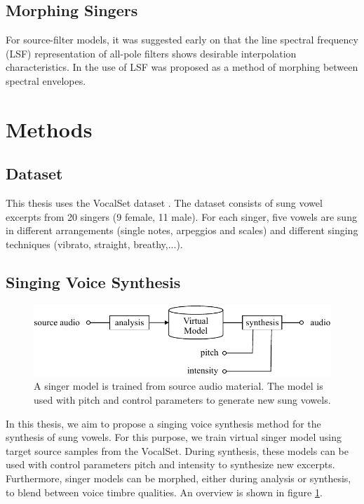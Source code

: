 \documentclass{article}
\begin{document}
\subsection{Morphing Singers}

For source-filter models, it was suggested early on that the line spectral frequency (LSF)\cite{itakura_line_1975} representation of all-pole filters shows desirable interpolation characteristics. In \cite{roddy_method_2014} the use of LSF was proposed as a method of morphing between spectral envelopes. 


\section{Methods}

\subsection{Dataset}

This thesis uses the VocalSet dataset \cite{wilkins_vocalset:_2018}. The dataset consists of sung vowel excerpts from 20 singers (9 female, 11 male). For each singer, five vowels are sung in different arrangements (single notes, arpeggios and scales) and different singing techniques (vibrato, straight, breathy,...). 

\subsection{Singing Voice Synthesis}

\begin{figure}[H]
    \centering
    \includegraphics{Graphics/005_method_singer_model.pdf}
    \caption{A singer model is trained from source audio material. The model is used with pitch and control parameters to generate new sung vowels.}
    \label{fig:singer_model}
\end{figure}

In this thesis, we aim to propose a singing voice synthesis method for the synthesis of sung vowels. For this purpose, we train virtual singer model using target source samples from the VocalSet. During synthesis, these models can be used with control parameters pitch and intensity to synthesize new excerpts. Furthermore, singer models can be morphed, either during analysis or synthesis, to blend between voice timbre qualities. An overview is shown in figure \ref{fig:singer_model}.\\
\end{document}
